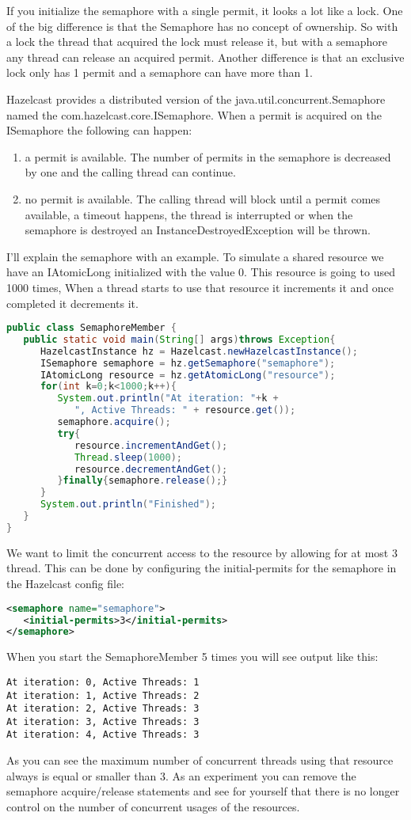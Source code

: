 If you initialize the semaphore with a single permit, it looks a lot like a lock. One of the big difference is that the Semaphore has no concept of ownership. So with a lock the thread that acquired the lock must release it, but with a semaphore any thread can release an acquired permit. Another difference is that an exclusive lock only has 1 permit and a semaphore can have more than 1.

Hazelcast provides a distributed version of the java.util.concurrent.Semaphore named the com.hazelcast.core.ISemaphore. When a permit is acquired on the ISemaphore the following can happen:
\begin{enumerate}
\item a permit is available. The number of permits in the semaphore is decreased by one and the calling thread can continue. 
\item no permit is available. The calling thread will block until a permit comes available, a timeout happens, the thread is interrupted or when the semaphore is destroyed an InstanceDestroyedException will be thrown.
\end{enumerate}
I'll explain the semaphore with an example. To simulate a shared resource we have an IAtomicLong initialized with the value 0. This resource is going to used 1000 times, When a thread starts to use that resource it increments it and once completed it decrements it.
\begin{lstlisting}[language=java]
public class SemaphoreMember {
   public static void main(String[] args)throws Exception{
      HazelcastInstance hz = Hazelcast.newHazelcastInstance();
      ISemaphore semaphore = hz.getSemaphore("semaphore");
      IAtomicLong resource = hz.getAtomicLong("resource");
      for(int k=0;k<1000;k++){
         System.out.println("At iteration: "+k +
            ", Active Threads: " + resource.get());
         semaphore.acquire();
         try{
            resource.incrementAndGet();
            Thread.sleep(1000);
            resource.decrementAndGet();
         }finally{semaphore.release();}
      }
      System.out.println("Finished");
   }
}
\end{lstlisting}
We want to limit the concurrent access to the resource by allowing for at most 3 thread. This can be done by configuring the initial-permits for the semaphore in the Hazelcast config file:
\begin{lstlisting}[language=xml]
<semaphore name="semaphore">
   <initial-permits>3</initial-permits>
</semaphore>
\end{lstlisting}
When you start the SemaphoreMember 5 times you will see output like this:
\begin{lstlisting}
At iteration: 0, Active Threads: 1
At iteration: 1, Active Threads: 2
At iteration: 2, Active Threads: 3
At iteration: 3, Active Threads: 3
At iteration: 4, Active Threads: 3
\end{lstlisting}
As you can see the maximum number of concurrent threads using that resource always is equal or smaller than 3. As an experiment you can remove the semaphore acquire/release statements and see for yourself that there is no longer control on the number of concurrent usages of the resources.

